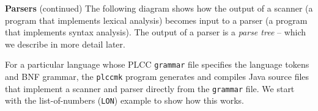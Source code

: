 \begin{minipage}[t]{\sw}
\slidenumber
\LARGE
{\bf Parsers} (continued)\exx
The following diagram shows how the output of a scanner
(a program that implements lexical analysis)
becomes input to a parser
(a program that implements syntax analysis).
The output of a parser is a {\em parse tree} --
which we describe in more detail later.\exx
\centerline{}\exx
For a particular language whose PLCC \verb'grammar' file
specifies the language tokens and BNF grammar,
the \verb'plccmk' program generates and compiles Java source files
that implement a scanner and parser
directly from the \verb'grammar' file.\exx
We start with the list-of-numbers (\verb'LON') example
to show how this works.
\end{minipage}
\clearpage
